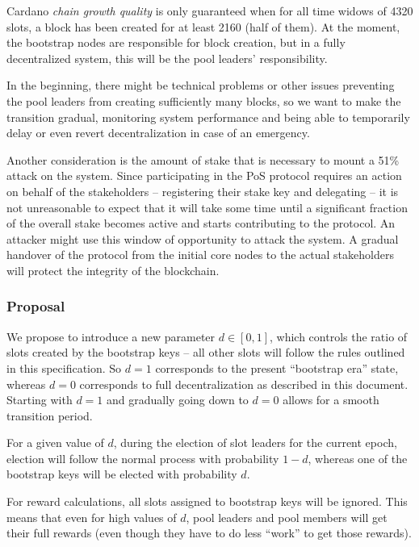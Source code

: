\documentclass[11pt,a4paper]{article}
\begin{document}
Cardano \emph{chain growth quality} is only guaranteed when for all time
widows of 4320 slots, a block has been created for at least 2160 (half
of them). At the moment, the bootstrap nodes are responsible for block
creation, but in a fully decentralized system, this will be the pool
leaders' responsibility.

In the beginning, there might be technical problems or other issues
preventing the pool leaders from creating sufficiently many blocks, so
we want to make the transition gradual, monitoring system performance
and being able to temporarily delay or even revert decentralization in
case of an emergency.

Another consideration is the amount of stake that is necessary to mount
a 51\% attack on the system. Since participating in the PoS protocol
requires an action on behalf of the stakeholders -- registering their
stake key and delegating -- it is not unreasonable to expect that it
will take some time until a significant fraction of the overall stake
becomes active and starts contributing to the protocol. An attacker
might use this window of opportunity to attack the system. A gradual
handover of the protocol from the initial core nodes to the actual
stakeholders will protect the integrity of the blockchain.

\subsubsection{Proposal}
\label{proposal}

We propose to introduce a new parameter \(d\in[0,1]\), which controls
the ratio of slots created by the bootstrap keys -- all other slots will
follow the rules outlined in this specification. So \(d=1\) corresponds
to the present ``bootstrap era'' state, whereas \(d=0\) corresponds to
full decentralization as described in this document. Starting with
\(d=1\) and gradually going down to \(d=0\) allows for a smooth
transition period.

For a given value of \(d\), during the election of slot leaders for the
current epoch, election will follow the normal process with probability
\(1-d\), whereas one of the bootstrap keys will be elected with
probability \(d\).

For reward calculations, all slots assigned to bootstrap keys will be
ignored. This means that even for high values of \(d\), pool leaders and
pool members will get their full rewards (even though they have to do
less ``work'' to get those rewards).
\end{document}
